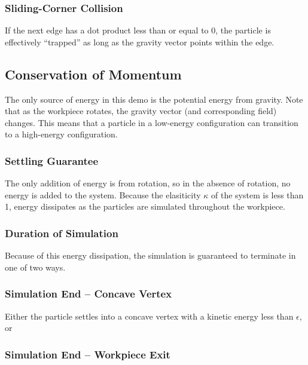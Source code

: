 
		\subsubsection{Sliding-Corner Collision}

		If the next edge has a dot product less than or equal to 0, the particle is effectively ``trapped'' as long as the gravity vector points within the edge.


	\subsection{Conservation of Momentum}

		The only source of energy in this demo is the potential energy from gravity. Note that as the workpiece rotates, the gravity vector (and corresponding field) changes. This means that a particle in a low-energy configuration can transition to a high-energy configuration.

		\subsubsection{Settling Guarantee}

		The only addition of energy is from rotation, so in the absence of rotation, no energy is added to the system. Because the elasiticity $\kappa$ of the system is less than 1, energy dissipates as the particles are simulated throughout the workpiece.

		\subsubsection{Duration of Simulation}

		Because of this energy dissipation, the simulation is guaranteed to terminate in one of two ways.

		\subsubsection{Simulation End -- Concave Vertex}

		Either the particle settles into a concave vertex with a kinetic energy less than $\epsilon$, or

		\subsubsection{Simulation End -- Workpiece Exit}

